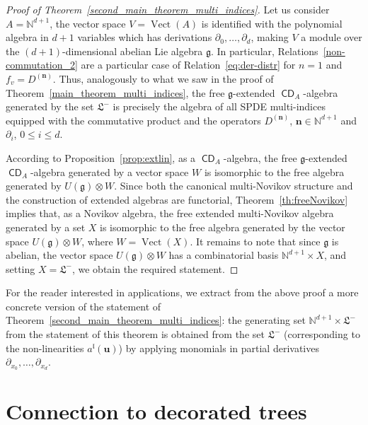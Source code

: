 \documentclass[AHL,Unicode,longabstracts]{cedram}
\newcommand{\bn}{\mathbf{n}}
\newcommand{\bu}{\mathbf{u}}
\newcommand{\mfl}{\mathfrak{l}}
\newcommand{\mfL}{\mathfrak{L}}
\newcommand*\fkg{\mathfrak{g}}
\newcommand{\bbN}{\mathbb{N}}
\DeclareMathOperator{\CDi}{\mathsf{CD}}
\DeclareMathOperator{\Vect}{Vect}
\begin{document}
\begin{proof}[{Proof of Theorem~\ref{second_main_theorem_multi_indices}}]
Let us consider $A=\bbN^{d+1}$, the vector space $V=\Vect(A)$ is identified with the polynomial algebra in $d+1$ variables which has derivations $\partial_0, \dots, \partial_d$, making $V$ a module over the $(d+1)$-dimensional abelian Lie algebra $\fkg$. In particular, Relations~\eqref{non-commutation_2} are a particular case of Relation~\eqref{eq:der-distr} for $n=1$ and $f_v=D^{(\bn)}$. Thus, analogously to what we saw in the proof of Theorem~\ref{main_theorem_multi_indices}, the free $\fkg$-extended $\CDi_A$-algebra generated by the set $\mfL^-$ is precisely the algebra of all SPDE multi-indices equipped with the commutative product and the operators $D^{(\bn)}$, $\bn\in \bbN^{d+1}$ and $\partial_i$, $0\le i\le d$.

According to Proposition~\ref{prop:extlin}, as a $\CDi_A$-algebra, the free $\fkg$-extended $\CDi_A$-algebra generated by a vector space $W$ is isomorphic to the free algebra generated by $U(\fkg)\otimes W$. Since both the canonical multi-Novikov structure and the construction of extended algebras are functorial, Theorem~\ref{th:freeNovikov} implies that, as a Novikov algebra, the free extended multi-Novikov algebra generated by a set $X$ is isomorphic to the free algebra generated by the vector space $U(\fkg)\otimes W$, where $W=\Vect(X)$. It remains to note that since $\fkg$ is abelian, the vector space $U(\fkg)\otimes W$ has a combinatorial basis $\bbN^{d+1}\times X$, and setting $X=\mfL^-$, we obtain the required statement.
\end{proof}

For the reader interested in applications, we extract from the above proof a more concrete version of the statement of Theorem~\ref{second_main_theorem_multi_indices}: the generating set $\bbN^{d+1}\times \mfL^-$ from the statement of this theorem is obtained from the set $\mfL^-$ (corresponding to the non-linearities $a^\mfl(\bu)$) by applying monomials in partial derivatives $\partial_{x_0},\dots,\partial_{x_{d}}$.



\section{Connection to decorated trees}\label{sec::6}
\end{document}
